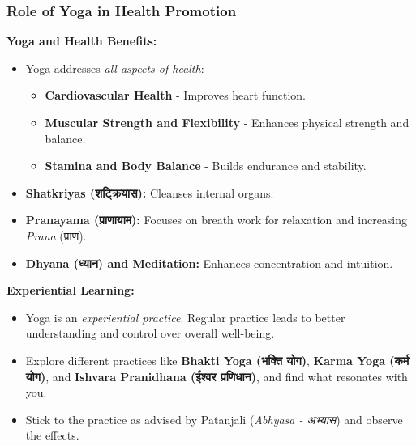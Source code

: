 \begin{frame}[fragile]\frametitle{Role of Yoga in Health Promotion}
    \textbf{Yoga and Health Benefits:}
    \begin{itemize}
        \item Yoga addresses \textit{all aspects of health}:
        \begin{itemize}
            \item \textbf{Cardiovascular Health} - Improves heart function.
            \item \textbf{Muscular Strength and Flexibility} - Enhances physical strength and balance.
            \item \textbf{Stamina and Body Balance} - Builds endurance and stability.
        \end{itemize}
        \item \textbf{Shatkriyas (शट्क्रियास):} Cleanses internal organs.
        \item \textbf{Pranayama (प्राणायाम):} Focuses on breath work for relaxation and increasing \textit{Prana} (प्राण).
        \item \textbf{Dhyana (ध्यान) and Meditation:} Enhances concentration and intuition.
    \end{itemize}

    \textbf{Experiential Learning:}
    \begin{itemize}
        \item Yoga is an \textit{experiential practice}. Regular practice leads to better understanding and control over overall well-being.
        \item Explore different practices like \textbf{Bhakti Yoga (भक्ति योग)}, \textbf{Karma Yoga (कर्म योग)}, and \textbf{Ishvara Pranidhana (ईश्वर प्रणिधान)}, and find what resonates with you.
        \item Stick to the practice as advised by Patanjali (\textit{Abhyasa - अभ्यास}) and observe the effects.
    \end{itemize}
\end{frame}

